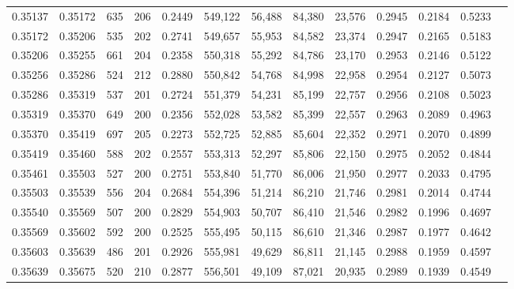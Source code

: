 \begin{tabular}{rrrrrrrrrrrrr}
0.35137 & 0.35172 &   635 & 206 &                                     0.2449 & 549,122 &  56,488 &  84,380 &  23,576 & 0.2945 & 0.2184 & 0.5233 \\
0.35172 & 0.35206 &   535 & 202 &                                     0.2741 & 549,657 &  55,953 &  84,582 &  23,374 & 0.2947 & 0.2165 & 0.5183 \\
0.35206 & 0.35255 &   661 & 204 &                                     0.2358 & 550,318 &  55,292 &  84,786 &  23,170 & 0.2953 & 0.2146 & 0.5122 \\
0.35256 & 0.35286 &   524 & 212 &                                     0.2880 & 550,842 &  54,768 &  84,998 &  22,958 & 0.2954 & 0.2127 & 0.5073 \\
0.35286 & 0.35319 &   537 & 201 &                                     0.2724 & 551,379 &  54,231 &  85,199 &  22,757 & 0.2956 & 0.2108 & 0.5023 \\
0.35319 & 0.35370 &   649 & 200 &                                     0.2356 & 552,028 &  53,582 &  85,399 &  22,557 & 0.2963 & 0.2089 & 0.4963 \\
0.35370 & 0.35419 &   697 & 205 &                                     0.2273 & 552,725 &  52,885 &  85,604 &  22,352 & 0.2971 & 0.2070 & 0.4899 \\
0.35419 & 0.35460 &   588 & 202 &                                     0.2557 & 553,313 &  52,297 &  85,806 &  22,150 & 0.2975 & 0.2052 & 0.4844 \\
0.35461 & 0.35503 &   527 & 200 &                                     0.2751 & 553,840 &  51,770 &  86,006 &  21,950 & 0.2977 & 0.2033 & 0.4795 \\
0.35503 & 0.35539 &   556 & 204 &                                     0.2684 & 554,396 &  51,214 &  86,210 &  21,746 & 0.2981 & 0.2014 & 0.4744 \\
0.35540 & 0.35569 &   507 & 200 &                                     0.2829 & 554,903 &  50,707 &  86,410 &  21,546 & 0.2982 & 0.1996 & 0.4697 \\
0.35569 & 0.35602 &   592 & 200 &                                     0.2525 & 555,495 &  50,115 &  86,610 &  21,346 & 0.2987 & 0.1977 & 0.4642 \\
0.35603 & 0.35639 &   486 & 201 &                                     0.2926 & 555,981 &  49,629 &  86,811 &  21,145 & 0.2988 & 0.1959 & 0.4597 \\
0.35639 & 0.35675 &   520 & 210 &                                     0.2877 & 556,501 &  49,109 &  87,021 &  20,935 & 0.2989 & 0.1939 & 0.4549 \\

\end{tabular}
